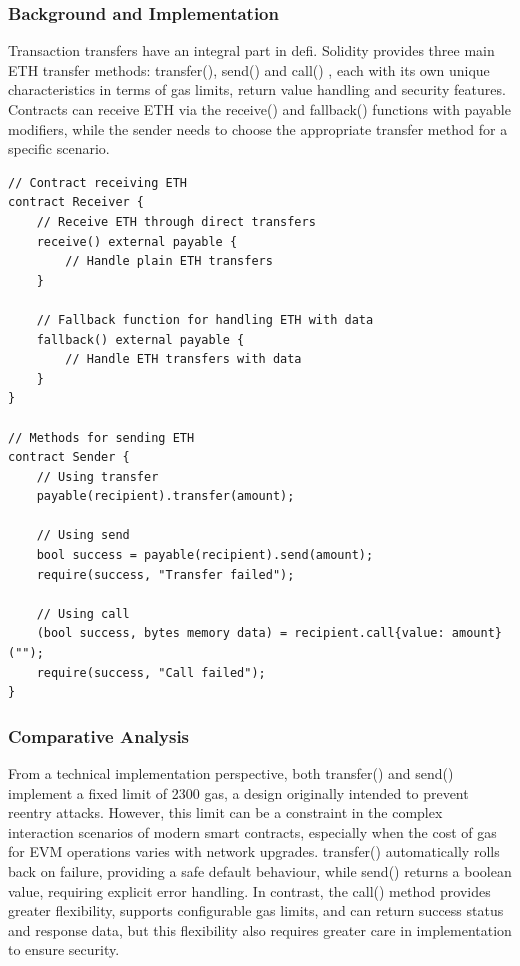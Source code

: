\documentclass[conference]{IEEEtran}
\begin{document}
\subsubsection{Background and Implementation}

Transaction transfers have an integral part in defi. Solidity provides three main ETH transfer methods: transfer(), send() and call() \cite{transferComparison} \cite{transferMedium}, each with its own unique characteristics in terms of gas limits, return value handling and security features. Contracts can receive ETH via the receive() and fallback() functions with payable modifiers, while the sender needs to choose the appropriate transfer method for a specific scenario.

\begin{lstlisting}[style=solidity]
// Contract receiving ETH
contract Receiver {
    // Receive ETH through direct transfers
    receive() external payable {
        // Handle plain ETH transfers
    }
    
    // Fallback function for handling ETH with data
    fallback() external payable {
        // Handle ETH transfers with data
    }
}

// Methods for sending ETH
contract Sender {
    // Using transfer
    payable(recipient).transfer(amount);

    // Using send
    bool success = payable(recipient).send(amount);
    require(success, "Transfer failed");

    // Using call
    (bool success, bytes memory data) = recipient.call{value: amount}("");
    require(success, "Call failed");
}
\end{lstlisting}

\subsubsection{Comparative Analysis}
From a technical implementation perspective, both transfer() and send() implement a fixed limit of 2300 gas, a design originally intended to prevent reentry attacks. However, this limit can be a constraint in the complex interaction scenarios of modern smart contracts, especially when the cost of gas for EVM operations varies with network upgrades. transfer() automatically rolls back on failure, providing a safe default behaviour, while send() returns a boolean value, requiring explicit error handling. In contrast, the call() method provides greater flexibility, supports configurable gas limits, and can return success status and response data, but this flexibility also requires greater care in implementation to ensure security.
\end{document}
